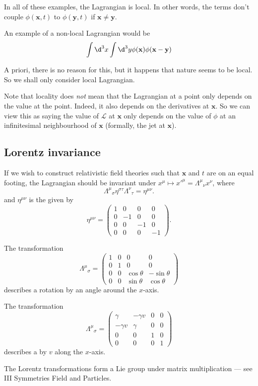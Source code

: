\documentclass[a4paper]{article}
\begin{document}
In all of these examples, the Lagrangian is local. In other words, the terms don't couple $\phi(\mathbf{x}, t)$ to $\phi(\mathbf{y}, t)$ if $\mathbf{x} \not= \mathbf{y}$.
\begin{eg}
  An example of a non-local Lagrangian would be
  \[
    \int \d^3 x \int \d^3 y \phi(\mathbf{x}) \phi(\mathbf{x} - \mathbf{y})
  \]
\end{eg}
A priori, there is no reason for this, but it happens that nature seems to be local. So we shall only consider local Lagrangian.

Note that locality does \emph{not} mean that the Lagrangian at a point only depends on the value at the point. Indeed, it also depends on the derivatives at $\mathbf{x}$. So we can view this as saying the value of $\mathcal{L}$ at $\mathbf{x}$ only depends on the value of $\phi$ at an infinitesimal neighbourhood of $\mathbf{x}$ (formally, the jet at $\mathbf{x}$).

\subsection{Lorentz invariance}
If we wish to construct relativistic field theories such that $\mathbf{x}$ and $t$ are on an equal footing, the Lagrangian should be invariant under  $x^\mu \mapsto x'^\mu = \Lambda^\mu\!_\nu x^\nu$, where
\[
  \Lambda^\mu\!_\sigma \eta^{\sigma\tau} \Lambda^\nu\!_\tau = \eta^{\mu\nu}.
\]
and $\eta^{\mu\nu}$ is the  given by
\[
  \eta^{\mu\nu} =
  \begin{pmatrix}
    1 & 0 & 0 & 0\\
    0 & -1 & 0 & 0\\
    0 & 0 & -1 & 0\\
    0 & 0 & 0 & -1
  \end{pmatrix}.
\]

\begin{eg}
  The transformation
  \[
    \Lambda^\mu\!_\sigma =
    \begin{pmatrix}
      1 & 0 & 0 & 0\\
      0 & 1 & 0 & 0\\
      0 & 0 & \cos \theta & -\sin \theta\\
      0 & 0 & \sin \theta & \cos \theta
    \end{pmatrix}
  \]
  describes a rotation by an angle around the $x$-axis.
\end{eg}

\begin{eg}
  The transformation
  \[
    \Lambda^\mu\!_\sigma =
    \begin{pmatrix}
      \gamma & -\gamma v & 0 & 0\\
      -\gamma v & \gamma & 0 & 0\\
      0 & 0 & 1 & 0\\
      0 & 0 & 0 & 1
    \end{pmatrix}
  \]
  describes a  by $v$ along the $x$-axis.
\end{eg}
The Lorentz transformations form a Lie group under matrix multiplication --- see III Symmetries Field and Particles.
\end{document}
